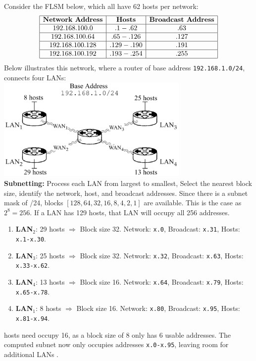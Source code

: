 \newpage 

\begin{Example}


Consider the FLSM below, which all have 62 hosts per network:
\[
\begin{array}{|c|c|c|}
\hline
\textbf{Network Address} & \textbf{Hosts} & \textbf{Broadcast Address} \\ \hline
192.168.100.0 & .1 - .62 & .63 \\ \hline
192.168.100.64 & .65 - .126 & .127 \\ \hline
192.168.100.128 & .129 - .190 & .191 \\ \hline
192.168.100.192 & .193 - .254 & .255 \\ \hline
\end{array}
\]
\noindent
Below illustrates this network, where a router of base address \texttt{192.168.1.0/24},
connects four LANs:\\

\hspace{4em}
\includegraphics[width=0.7\textwidth]{Sections/network/subnetting.png}\\

\noindent
\textbf{Subnetting:} Process each LAN from largest to smallest, Select the nearest block size, identify the network, host, and broadcast addresses.
Since there is a subnet mask of /24, blocks $[128, 64, 32, 16, 8, 4, 2, 1]$ are available. This is the case as 
$2^8 = 256$. If a LAN has 129 hosts, that LAN will occupy all 256 addresses.\\
\begin{enumerate}
    \item \textbf{LAN$_2$}: 29 hosts $\Rightarrow$ Block size 32. Network: \texttt{x.0}, Broadcast: \texttt{x.31}, Hosts: \texttt{x.1-x.30}.
    \item \textbf{LAN$_3$}: 25 hosts $\Rightarrow$ Block size 32. Network: \texttt{x.32}, Broadcast: \texttt{x.63}, Hosts: \texttt{x.33-x.62}.
    \item \textbf{LAN$_4$}: 13 hosts $\Rightarrow$ Block size 16. Network: \texttt{x.64}, Broadcast: \texttt{x.79}, Hosts: \texttt{x.65-x.78}.
    \item \textbf{LAN$_1$}: 8 hosts $\Rightarrow$ Block size 16. Network: \texttt{x.80}, Broadcast: \texttt{x.95}, Hosts: \texttt{x.81-x.94}.
\end{enumerate}

 hosts need occupy 16, as a block size of 8 only has 6 usable addresses. The computed subnet now only occupies addresses 
\texttt{x.0-x.95}, leaving room for additional LANs \cite{eastcharmer_vlsm_subnetting}. 

\end{Example}
    
